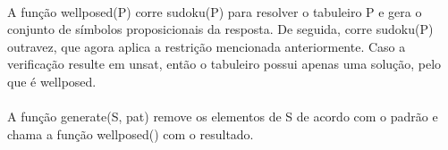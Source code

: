 \documentclass[a4paper,12pt]{article}
\begin{document}
\paragraph{}
A função well\textunderscore posed(P) corre sudoku(P) para resolver o tabuleiro P e gera o conjunto de símbolos proposicionais da resposta. De seguida, corre sudoku(P) outravez, que agora aplica a restrição mencionada anteriormente. Caso a verificação resulte em unsat, então o tabuleiro possui apenas uma solução, pelo que é well\textunderscore posed.

\paragraph{}
A função generate(S, pat) remove os elementos de S de acordo com o padrão e chama a função well\textunderscore posed() com o resultado.

\subsection{}
\end{document}
